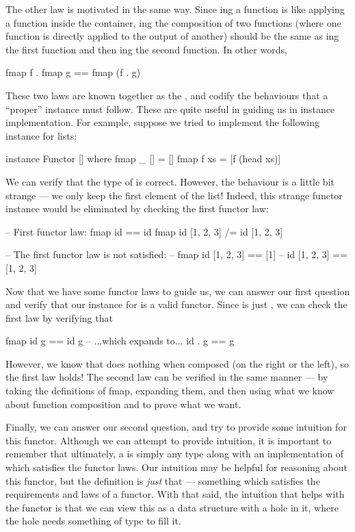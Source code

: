 The other law is motivated in the same way. Since ing a function is like applying a
function inside the container, ing the composition of two functions (where one function
is directly applied to the output of another) should be the same as ing the first
function and then ing the second function. In other words,
\begin{haskell}
fmap f . fmap g == fmap (f . g)
\end{haskell}

These two laws are known together as the , and codify the behaviours that a
``proper''  instance must follow. These are quite useful in guiding us in instance
implementation. For example, suppose we tried to implement the following  instance
for lists:
\begin{haskell}
instance Functor [] where
  fmap _ [] = []
  fmap f xs = [f (head xs)]
\end{haskell}
We can verify that the type of  is correct. However, the behaviour is a little bit
strange --- we only keep the first element of the list! Indeed, this strange functor instance would
be eliminated by checking the first functor law:
\begin{haskell}
-- First functor law: fmap id == id
fmap id [1, 2, 3] /= id [1, 2, 3]

-- The first functor law is not satisfied:
-- fmap id [1, 2, 3] == [1]
-- id [1, 2, 3] == [1, 2, 3]
\end{haskell}

Now that we have some functor laws to guide us, we can answer our first question and verify that our
instance for  is a valid functor. Since  is just , we can
check the first law by verifying that
\begin{haskell}
fmap id g == id g
-- ...which expands to...
id . g == g
\end{haskell}
However, we know that  does nothing when composed (on the right or the left), so the
first law holds! The second law can be verified in the same manner --- by taking the definitions of
fmap, expanding them, and then using what we know about function composition and  to
prove what we want.

Finally, we can answer our second question, and try to provide some intuition for this functor.
Although we can attempt to provide intuition, it is important to remember that ultimately, a
 is simply any type along with an implementation of  which satisfies
the functor laws. Our intuition may be helpful for reasoning about this functor, but the definition
is \emph{just} that --- something which satisfies the requirements and laws of a functor. With that
said, the intuition that helps with the  functor is that we can view this as a data
structure with a hole in it, where the hole needs something of type  to fill it.

